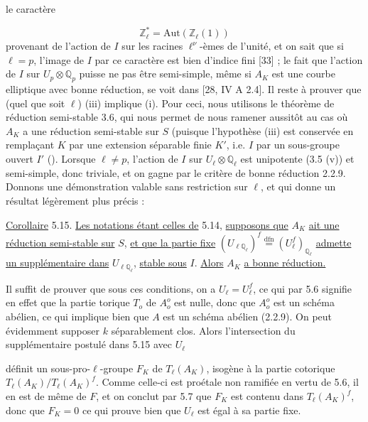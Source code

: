 
le caractère

\begin{equation*}
\mathbb{Z}_\ell^{*} = \mathrm{Aut}(\mathbb{Z}_\ell(1))
\end{equation*}
provenant de l'action de $I$ sur les racines $\ell^\nu$-èmes de l'unité, et on sait que si $\ell = p$, l'image de $I$ par ce caractère est bien d'indice fini [33] ; le fait que l'action de $I$ sur $U_p \otimes \mathbb{Q}_p$ puisse ne pas être semi-simple, même si $A_K$ est une courbe elliptique avec bonne réduction, se voit dans [28, IV A 2.4]. Il reste à prouver que (quel que soit $\ell$) (iii) implique (i). Pour ceci, nous utilisons le théorème de réduction semi-stable 3.6, qui nous permet de nous ramener aussitôt au cas où $A_K$ a une réduction semi-stable sur $S$ (puisque l'hypothèse (iii) est conservée en remplaçant $K$ par une extension séparable finie $K'$, i.e. $I$ par un sous-groupe ouvert $I'$ (\quad\quad ). Lorsque $\ell \neq p$, l'action de $I$ sur $U_\ell \otimes \mathbb{Q}_\ell$ est unipotente (3.5 (v)) et semi-simple, donc triviale, et on gagne par le critère de bonne réduction 2.2.9. Donnons une démonstration valable sans restriction sur $\ell$, et qui donne un résultat légèrement plus précis :

\underline{Corollaire} 5.15. \underline{Les notations étant celles de} 5.14, \underline{supposons que} $A_K$ \underline{ait une réduction semi-stable sur} $S$, \underline{et que la partie fixe} $(U_{\ell\mathbb{Q}_\ell})^f \stackrel{\mathrm{dfn}}{=} (U_\ell^f)_{\mathbb{Q}_\ell}$ \underline{admette un supplémentaire dans} $U_{\ell\mathbb{Q}_\ell}$, \underline{stable sous} $I$. \underline{Alors} $A_K$ \underline{a bonne réduction.}

Il suffit de prouver que sous ces conditions, on a $U_\ell = U_\ell^f$, ce qui par 5.6 signifie en effet que la partie torique $T_o$ de $A_o^o$ est nulle, donc que $A_o^o$ est un schéma abélien, ce qui implique bien que $A$ est un schéma abélien (2.2.9). On peut évidemment supposer $k$ séparablement clos. Alors l'intersection du supplémentaire postulé dans 5.15 avec $U_\ell$



définit un sous-pro-$\ell$-groupe $F_K$ de $T_\ell(A_K)$, isogène à la partie cotorique $T_\ell(A_K)/T_\ell(A_K)^f$. Comme celle-ci est proétale non ramifiée en vertu de 5.6, il en est de même de $F$, et on conclut par 5.7 que $F_K$ est contenu dans $T_\ell(A_K)^f$, donc que $F_K = 0$ ce qui prouve bien que $U_\ell$ est égal à sa partie fixe.


